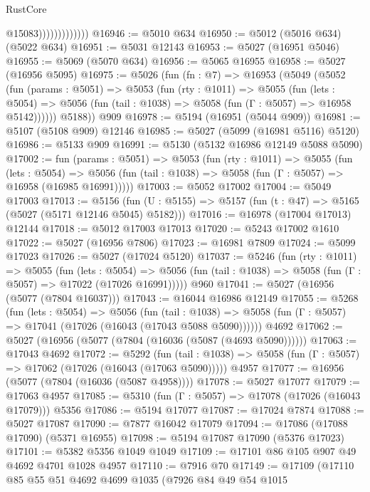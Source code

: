 \begin{lexlean}{RustCore}
\begin{coremodule}
                              @15083)))))))))))))
@16946 := @5010 @634
@16950 := @5012 (@5016 @634) (@5022 @634)
@16951 := @5031 @12143
@16953 := @5027 (@16951 @5046)
@16955 := @5069 (@5070 @634)
@16956 := @5065 @16955
@16958 := @5027 (@16956 @5095)
@16975 := @5026
    (fun (fn : @7) =>
    @16953
      (@5049
        (@5052
          (fun (params : @5051) =>
          @5053
            (fun (rty : @1011) =>
            @5055
              (fun (lets : @5054) =>
              @5056 (fun (tail : @1038) => @5058 (fun (Γ : @5057) => @16958 @5142))))))
        @5188))
    @909
@16978 := @5194 (@16951 (@5044 @909))
@16981 := @5107 (@5108 @909) @12146
@16985 := @5027 (@5099 (@16981 @5116) @5120)
@16986 := @5133 @909
@16991 := @5130 (@5132 @16986 @12149 @5088 @5090)
@17002 := fun (params : @5051) =>
  @5053
    (fun (rty : @1011) =>
    @5055
      (fun (lets : @5054) =>
      @5056 (fun (tail : @1038) => @5058 (fun (Γ : @5057) => @16958 (@16985 @16991)))))
@17003 := @5052 @17002
@17004 := @5049 @17003
@17013 := @5156
    (fun (U : @5155) => @5157 (fun (t : @47) => @5165 (@5027 (@5171 @12146 @5045) @5182)))
@17016 := @16978 (@17004 @17013) @12144
@17018 := @5012 @17003 @17013
@17020 := @5243 @17002 @1610
@17022 := @5027 (@16956 @7806)
@17023 := @16981 @7809
@17024 := @5099 @17023
@17026 := @5027 (@17024 @5120)
@17037 := @5246
    (fun (rty : @1011) =>
    @5055
      (fun (lets : @5054) =>
      @5056 (fun (tail : @1038) => @5058 (fun (Γ : @5057) => @17022 (@17026 @16991)))))
    @960
@17041 := @5027 (@16956 (@5077 (@7804 @16037)))
@17043 := @16044 @16986 @12149
@17055 := @5268
    (fun (lets : @5054) =>
    @5056
      (fun (tail : @1038) =>
      @5058 (fun (Γ : @5057) => @17041 (@17026 (@16043 (@17043 @5088 @5090))))))
    @4692
@17062 := @5027 (@16956 (@5077 (@7804 (@16036 (@5087 (@4693 @5090))))))
@17063 := @17043 @4692
@17072 := @5292
    (fun (tail : @1038) => @5058 (fun (Γ : @5057) => @17062 (@17026 (@16043 (@17063 @5090)))))
    @4957
@17077 := @16956 (@5077 (@7804 (@16036 (@5087 @4958))))
@17078 := @5027 @17077
@17079 := @17063 @4957
@17085 := @5310 (fun (Γ : @5057) => @17078 (@17026 (@16043 @17079))) @5356
@17086 := @5194 @17077
@17087 := @17024 @7874
@17088 := @5027 @17087
@17090 := @7877 @16042 @17079
@17094 := @17086 (@17088 @17090) (@5371 @16955)
@17098 := @5194 @17087 @17090 (@5376 @17023)
@17101 := @5382 @5356 @1049 @1049
@17109 := @17101 @86 @105 @907 @49 @4692 @4701 @1028 @4957
@17110 := @7916 @70
@17149 := @17109
    (@17110
      @85
      @55
      @51
      @4692
      @4699
      @1035
      (@7926
        @84
        @49
        @54
        @1015

\end{coremodule}
\end{lexlean}
